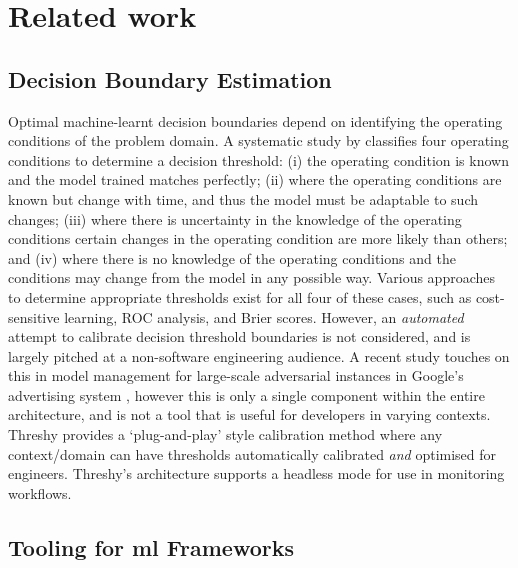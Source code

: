 \section{Related work}
\label{fse-demo2020:sec:related-work}

\subsection{Decision Boundary Estimation}

Optimal machine-learnt decision boundaries depend on identifying the operating conditions of the problem domain. A systematic study by \citet{Drummond2006} classifies four operating conditions to determine a decision threshold: (i) the operating condition is known and the model trained matches perfectly; (ii) where the operating conditions are known but change with time, and thus the model must be adaptable to such changes; (iii) where there is uncertainty in the knowledge of the operating conditions certain changes in the operating condition are more likely than others; and (iv) where there is no knowledge of the operating conditions and the conditions may change from the model in any possible way. Various approaches to determine appropriate thresholds exist for all four of these cases, such as cost-sensitive learning, ROC analysis, and Brier scores. However, an \textit{automated} attempt to calibrate decision threshold boundaries is not considered, and is largely pitched at a non-software engineering audience. A recent study touches on this in model management for large-scale adversarial instances in Google's advertising system \citep{sculley2011detecting}, however this is only a single component within the entire architecture, and is not a tool that is useful for developers in varying contexts. Threshy provides a `plug-and-play' style calibration method where any context/domain can have thresholds automatically calibrated \textit{and} optimised for engineers. Threshy’s architecture supports a headless mode for use in monitoring workflows.

\subsection{Tooling for \gls{ml} Frameworks}

